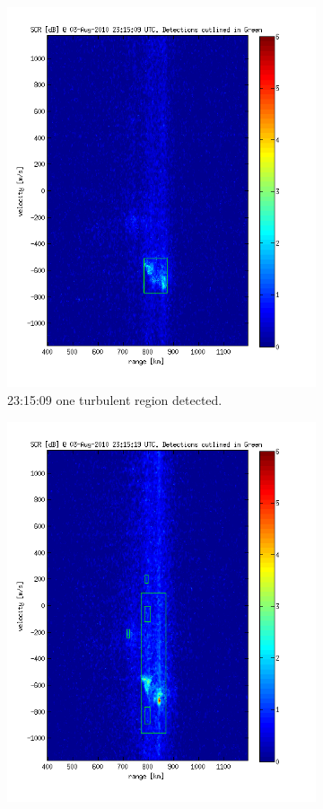 \begin{figure}
\begin{subfigure}[t]{0.45\linewidth}
        \includegraphics[width=\linewidth]{gfx/out-001}
        \caption{23:15:09 one turbulent region detected.}
    \end{subfigure}
    \begin{subfigure}[t]{0.45\linewidth}
        \includegraphics[width=\linewidth]{gfx/out-002}

\end{subfigure}
\end{figure}

